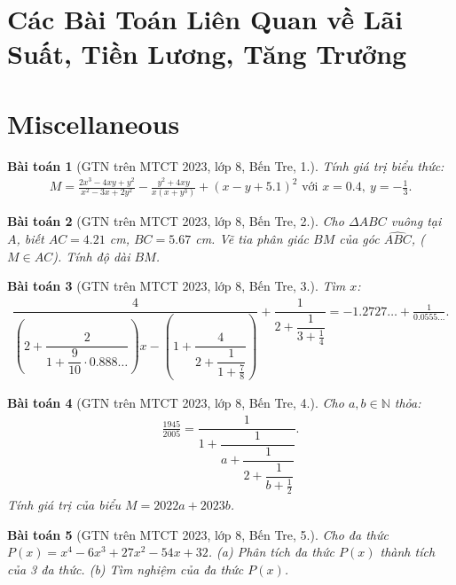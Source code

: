 \documentclass{article}
\newtheorem{baitoan}{Bài toán}
\begin{document}
\section{Các Bài Toán Liên Quan về Lãi Suất, Tiền Lương, Tăng Trưởng}


\section{Miscellaneous}

\begin{baitoan}[GTN trên MTCT 2023, lớp 8, Bến Tre, 1.]
	Tính giá trị biểu thức:
	\begin{align*}
		M = \frac{2x^3 - 4xy + y^2}{x^2 - 3x + 2y^2} - \frac{y^2 + 4xy}{x(x + y^3)} + (x - y + 5.1)^2\mbox{ với } x = 0.4,\ y = -\frac{1}{3}.
	\end{align*}
\end{baitoan}

\begin{baitoan}[GTN trên MTCT 2023, lớp 8, Bến Tre, 2.]
	Cho $\Delta ABC$ vuông tại $A$, biết $AC = 4.21$ \emph{cm}, $BC = 5.67$ \emph{cm}. Vẽ tia phân giác $BM$ của góc $\widehat{ABC}$, ($M\in AC$). Tính độ dài $BM$.
\end{baitoan}

\begin{baitoan}[GTN trên MTCT 2023, lớp 8, Bến Tre, 3.]
	Tìm $x$:
	\begin{align*}
		\dfrac{4}{\left(2 + \dfrac{2}{1 + \dfrac{9}{10}\cdot0.888\ldots}\right)x - \left(1 + \dfrac{4}{2 + \dfrac{1}{1 + \frac{7}{8}}}\right)} + \dfrac{1}{2 + \dfrac{1}{3 + \frac{1}{4}}} = -1.2727\ldots + \frac{1}{0.0555\ldots}.
	\end{align*}
\end{baitoan}

\begin{baitoan}[GTN trên MTCT 2023, lớp 8, Bến Tre, 4.]
	Cho $a,b\in\mathbb{N}$ thỏa:
	\begin{align*}
		\frac{1945}{2005} = \dfrac{1}{1 + \dfrac{1}{a + \dfrac{1}{2 + \dfrac{1}{b + \frac{1}{2}}}}}.
	\end{align*}
	Tính giá trị của biểu $M = 2022a + 2023b$.
\end{baitoan}

\begin{baitoan}[GTN trên MTCT 2023, lớp 8, Bến Tre, 5.]
	Cho đa thức $P(x) = x^4 - 6x^3 + 27x^2 - 54x + 32$. (a) Phân tích đa thức $P(x)$ thành tích của 3 đa thức. (b) Tìm nghiệm của đa thức $P(x)$.
\end{baitoan}
\end{document}
